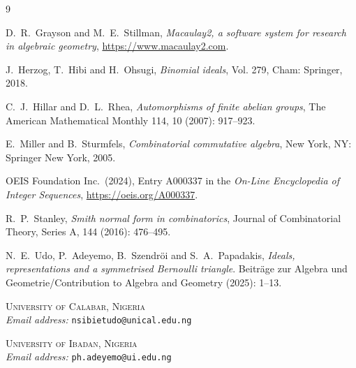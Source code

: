 \documentclass[11pt]{amsart}
\theoremstyle{plain}
\theoremstyle{definition}
\theoremstyle{remark}
\begin{document}
\begin{thebibliography}{9}

     D.~R.~Grayson and M.~E.~Stillman, \textit{Macaulay2, a software system for research in algebraic geometry}, \url{https://www.macaulay2.com}.


     J.~Herzog, T.~Hibi and H.~Ohsugi, \emph{Binomial ideals}, Vol. 279, Cham: Springer, 2018.

     C.~J.~Hillar and D.~L.~Rhea, \emph{Automorphisms of finite abelian groups}, The American Mathematical Monthly 114, 10 (2007): 917--923.
	
	 E.~Miller and B.~Sturmfels, \emph{Combinatorial commutative algebra}, New York, NY: Springer New York, 2005.
	
	 OEIS Foundation Inc.~(2024), Entry A000337 in the \textit{On-Line Encyclopedia of Integer Sequences}, \url{https://oeis.org/A000337}.
    
	 R.~P.~Stanley, \emph{Smith normal form in combinatorics}, Journal of Combinatorial Theory, Series A, 144 (2016): 476--495.
	
	 N.~E.~Udo, P.~Adeyemo, B.~Szendr\"{o}i and S.~A.~Papadakis, \emph{Ideals, representations and a symmetrised Bernoulli triangle}. Beitr\"{a}ge zur Algebra und Geometrie/Contribution to Algebra and Geometry (2025): 1--13.
	
	
\end{thebibliography}

\vspace{2em}
\noindent
\textsc{University of Calabar, Nigeria} \\
\textit{Email address:} \texttt{nsibietudo@unical.edu.ng}

\vspace{1em}
\noindent
\textsc{University of Ibadan, Nigeria} \\
\textit{Email address:} \texttt{ph.adeyemo@ui.edu.ng}
\end{document}
